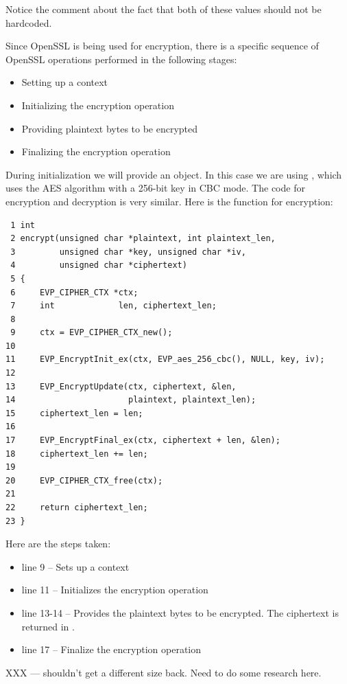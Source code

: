 \noindent
Notice the comment about the fact that both of these values should not be hardcoded.

Since OpenSSL is being used for encryption, there is a specific sequence of OpenSSL operations performed in the following stages:

\begin{itemize}
	\item Setting up a context
	\item Initializing the encryption operation
	\item Providing plaintext bytes to be encrypted
	\item Finalizing the encryption operation
\end{itemize}

\noindent
During initialization we will provide an  object. In this case we are using , which uses the AES algorithm with a 256-bit key in CBC mode. The code for encryption and decryption is very similar. Here is the function for encryption:

\begin{lstlisting}
 1 int
 2 encrypt(unsigned char *plaintext, int plaintext_len,
 3         unsigned char *key, unsigned char *iv,
 4         unsigned char *ciphertext)
 5 {
 6     EVP_CIPHER_CTX *ctx;
 7     int             len, ciphertext_len;
 8  
 9     ctx = EVP_CIPHER_CTX_new();
10  
11     EVP_EncryptInit_ex(ctx, EVP_aes_256_cbc(), NULL, key, iv);
12  
13     EVP_EncryptUpdate(ctx, ciphertext, &len,
14                       plaintext, plaintext_len);
15     ciphertext_len = len;
16  
17     EVP_EncryptFinal_ex(ctx, ciphertext + len, &len);
18     ciphertext_len += len;
19  
20     EVP_CIPHER_CTX_free(ctx);
21  
22     return ciphertext_len;
23 }
\end{lstlisting}

\noindent
Here are the steps taken:

\begin{itemize}
	\item line 9 -- Sets up a context
	\item line 11 -- Initializes the encryption operation
	\item line 13-14 -- Provides the plaintext bytes to be encrypted. The ciphertext is returned in .
	\item line 17 -- Finalize the encryption operation
\end{itemize}

\noindent
XXX --- shouldn't get a different size back. Need to do some research here.

